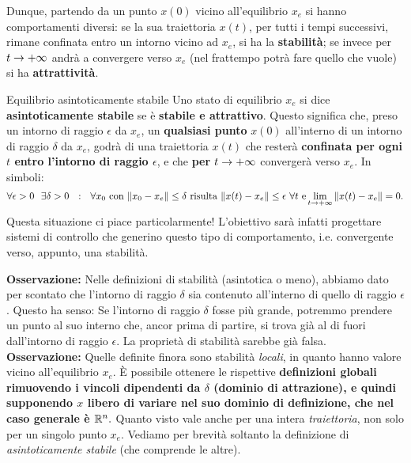 \documentclass[a4paper]{report}
\begin{document}
Dunque, partendo da un punto $x(0)$ vicino all'equilibrio $x_e$ si hanno comportamenti diversi: se la sua traiettoria $x(t)$, per tutti i tempi successivi, rimane confinata entro un intorno vicino ad $x_e$, si ha la \textbf{stabilità}; se invece per $t \rightarrow +\infty$ andrà a convergere verso $x_e$ (nel frattempo potrà fare quello che vuole) si ha \textbf{attrattività}. 
\bb
\begin{defin}{Equilibrio asintoticamente stabile}{}
	Uno stato di equilibrio $x_e$ si dice \textbf{asintoticamente stabile} se è \textbf{stabile e attrattivo}. Questo significa che, preso un intorno di raggio $\epsilon$ da $x_e$, un \textbf{qualsiasi punto} $x(0)$ all'interno di un intorno di raggio $\delta$ da $x_e$, godrà di una traiettoria $x(t)$ che resterà \textbf{confinata per ogni $t$ entro l'intorno di raggio $\epsilon$}, e che \textbf{per $t \rightarrow +\infty$} convergerà verso $x_e$. In simboli:
	\begin{equation*}
		\forall \epsilon > 0 \ \ \exists \delta > 0 \ \ : \ \ \forall x_0 \ \textrm{con} \ \norm{x_0 - x_e} \leq \delta \ \textrm{risulta} \ \norm{x(t) - x_e} \leq \epsilon \ \forall t \ \textrm{e} \llimit{t}{\pinf}{\norm{x(t)-x_e}} = 0.
	\end{equation*}
	Questa situazione ci piace particolarmente! L'obiettivo sarà infatti progettare sistemi di controllo che generino questo tipo di comportamento, i.e. convergente verso, appunto, una stabilità.
\end{defin}
\bb
\textbf{Osservazione:} Nelle definizioni di stabilità (asintotica o meno), abbiamo dato per scontato che l'intorno di raggio $\delta$ sia contenuto all'interno di quello di raggio $\epsilon$. Questo ha senso: Se l'intorno di raggio $\delta$ fosse più grande, potremmo prendere un punto al suo interno che, ancor prima di partire, si trova già al di fuori dall'intorno di raggio $\epsilon$. La proprietà di stabilità sarebbe già falsa. 
\bb
\textbf{Osservazione:} Quelle definite finora sono stabilità \textit{locali}, in quanto hanno valore vicino all'equilibrio $x_e$. È possibile ottenere le rispettive \textbf{definizioni globali rimuovendo i vincoli dipendenti da $\delta$ (dominio di attrazione), e quindi supponendo $x$ libero di variare nel suo dominio di definizione, che nel caso generale è $\mathbb{R}^n.$}
\bb
Quanto visto vale anche per una intera \textit{traiettoria}, non solo per un singolo punto $x_e$. Vediamo per brevità soltanto la definizione di \textit{asintoticamente stabile} (che comprende le altre).
\end{document}
